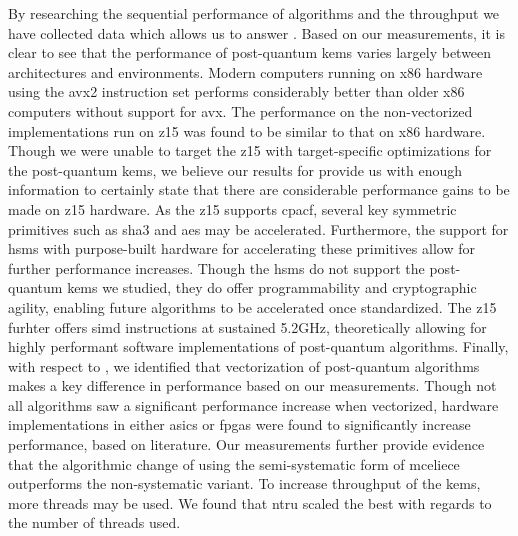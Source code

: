 By researching the sequential performance of algorithms and the throughput we have collected data which allows us to answer . Based on our measurements, it is clear to see that the performance of \gls{post-quantum} \glspl{kem} varies largely between architectures and environments. Modern computers running on \gls{x86} hardware using the \gls{avx2} instruction set performs considerably better than older \gls{x86} computers without support for \gls{avx}. The performance on the non-vectorized implementations run on \gls{z15} was found to be similar to that on \gls{x86} hardware. Though we were unable to target the \gls{z15} with target-specific optimizations for the \gls{post-quantum} \glspl{kem}, we believe our results for  provide us with enough information to certainly state that there are considerable performance gains to be made on \gls{z15} hardware. As the \gls{z15} supports \gls{cpacf}, several key symmetric primitives such as \gls{sha3} and \gls{aes} may be accelerated. Furthermore, the support for \glspl{hsm} with purpose-built hardware for accelerating these primitives allow for further performance increases. Though the \glspl{hsm} do not support the \gls{post-quantum} \glspl{kem} we studied, they do offer programmability and cryptographic agility, enabling future algorithms to be accelerated once standardized. The \gls{z15} furhter offers \gls{simd} instructions at sustained 5.2GHz, theoretically allowing for highly performant software implementations of \gls{post-quantum} algorithms. Finally, with respect to , we identified that vectorization of \gls{post-quantum} algorithms makes a key difference in performance based on our measurements. Though not all algorithms saw a significant performance increase when vectorized, hardware implementations in either \glspl{asic} or \glspl{fpga} were found to significantly increase performance, based on literature. Our measurements further provide evidence that the algorithmic change of using the semi-systematic form of \gls{mceliece} outperforms the non-systematic variant. To increase throughput of the \glspl{kem}, more threads may be used. We found that \gls{ntru} scaled the best with regards to the number of threads used.



